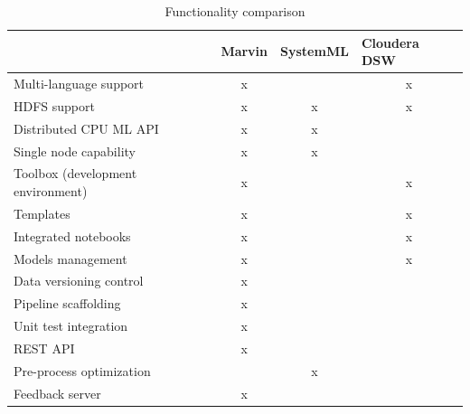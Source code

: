 \documentclass[twoside,11pt]{article}
\begin{document}
\begin{table}[!htbp]
\centering
\begin{tabular}{|l|c|c|l|}
\hline
                                  & \multicolumn{1}{l|}{\textbf{Marvin}} & \multicolumn{1}{l|}{\textbf{SystemML}} & \textbf{Cloudera DSW}  \\ \hline
Multi-language support            & x                                    & \multicolumn{1}{l|}{}                  & \multicolumn{1}{c|}{x} \\ \hline
HDFS support                      & x                                    & x                                      & \multicolumn{1}{c|}{x} \\ \hline
Distributed CPU ML API            & x                                    & x                                      &                        \\ \hline
Single node capability            & x                                    & x                                      &                        \\ \hline
Toolbox (development environment) & x                                    &                                        & \multicolumn{1}{c|}{x} \\ \hline
Templates                         & x                                    &                                        & \multicolumn{1}{c|}{x} \\ \hline
Integrated notebooks              & x                                    &                                        & \multicolumn{1}{c|}{x} \\ \hline
Models management                 & x                                    &                                        & \multicolumn{1}{c|}{x} \\ \hline
Data versioning control           & x                                    &                                        &                        \\ \hline
Pipeline scaffolding              & x                                    &                                        &                        \\ \hline
Unit test integration             & x                                    &                                        &                        \\ \hline
REST API                          & x                                    &                                        &                        \\ \hline
Pre-process optimization          &                                      & x                                      &                        \\ \hline
Feedback server          & x                                     &                                       &                        \\ \hline
\end{tabular}
\caption{Functionality comparison}
\label{table-comp}
\end{table}
\end{document}
